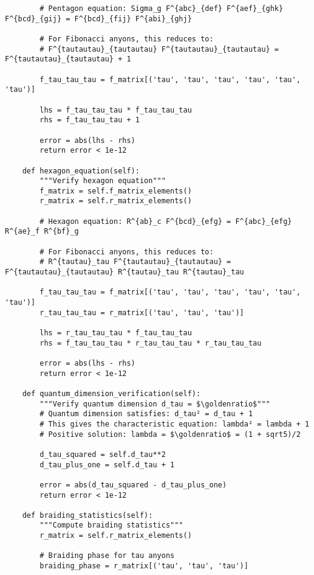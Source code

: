 \documentclass[11pt]{article}
\theoremstyle{definition}
\newcommand{\goldenratio}{\phi}
\begin{document}
\begin{verbatim}
        # Pentagon equation: Sigma_g F^{abc}_{def} F^{aef}_{ghk} F^{bcd}_{gij} = F^{bcd}_{fij} F^{abi}_{ghj}
        
        # For Fibonacci anyons, this reduces to:
        # F^{tautautau}_{tautautau} F^{tautautau}_{tautautau} = F^{tautautau}_{tautautau} + 1
        
        f_tau_tau_tau = f_matrix[('tau', 'tau', 'tau', 'tau', 'tau', 'tau')]
        
        lhs = f_tau_tau_tau * f_tau_tau_tau
        rhs = f_tau_tau_tau + 1
        
        error = abs(lhs - rhs)
        return error < 1e-12
    
    def hexagon_equation(self):
        """Verify hexagon equation"""
        f_matrix = self.f_matrix_elements()
        r_matrix = self.r_matrix_elements()
        
        # Hexagon equation: R^{ab}_c F^{bcd}_{efg} = F^{abc}_{efg} R^{ae}_f R^{bf}_g
        
        # For Fibonacci anyons, this reduces to:
        # R^{tautau}_tau F^{tautautau}_{tautautau} = F^{tautautau}_{tautautau} R^{tautau}_tau R^{tautau}_tau
        
        f_tau_tau_tau = f_matrix[('tau', 'tau', 'tau', 'tau', 'tau', 'tau')]
        r_tau_tau_tau = r_matrix[('tau', 'tau', 'tau')]
        
        lhs = r_tau_tau_tau * f_tau_tau_tau
        rhs = f_tau_tau_tau * r_tau_tau_tau * r_tau_tau_tau
        
        error = abs(lhs - rhs)
        return error < 1e-12
    
    def quantum_dimension_verification(self):
        """Verify quantum dimension d_tau = $\goldenratio$"""
        # Quantum dimension satisfies: d_tau² = d_tau + 1
        # This gives the characteristic equation: lambda² = lambda + 1
        # Positive solution: lambda = $\goldenratio$ = (1 + sqrt5)/2
        
        d_tau_squared = self.d_tau**2
        d_tau_plus_one = self.d_tau + 1
        
        error = abs(d_tau_squared - d_tau_plus_one)
        return error < 1e-12
    
    def braiding_statistics(self):
        """Compute braiding statistics"""
        r_matrix = self.r_matrix_elements()
        
        # Braiding phase for tau anyons
        braiding_phase = r_matrix[('tau', 'tau', 'tau')]
        

\end{verbatim}
\end{document}
